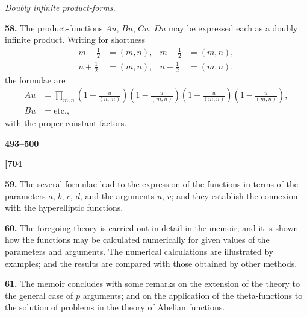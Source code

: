 \documentclass[11pt,a4paper]{book}
\begin{document}
\vspace{1em}

\begin{center}
\textit{Doubly infinite product-forms.}
\end{center}

\vspace{0.5em}

\noindent\textbf{58.}\quad
The product-functions $Au$, $Bu$, $Cu$, $Du$ may be expressed each as a doubly infinite product. Writing for shortness
\begin{align*}
m + \tfrac{1}{2} &= (m, n), & m - \tfrac{1}{2} &= (m, n), \\
n + \tfrac{1}{2} &= (m, n), & n - \tfrac{1}{2} &= (m, n),
\end{align*}
the formulae are
\begin{align*}
Au &= \prod_{m,n} \left(1 - \frac{u}{(m,n)}\right)\left(1 - \frac{u}{(m,n)}\right)\left(1 - \frac{u}{(m,n)}\right)\left(1 - \frac{u}{(m,n)}\right), \\
Bu &= \text{etc.},
\end{align*}
with the proper constant factors.

\vspace{1em}

\begin{center}
\textbf{493--500}
\end{center}

\vspace{0.5em}

\noindent\textbf{[704}

\vspace{0.5em}

\noindent\textbf{59.}\quad
The several formulae lead to the expression of the functions in terms of the parameters $a$, $b$, $c$, $d$, and the arguments $u$, $v$; and they establish the connexion with the hyperelliptic functions.

\noindent\textbf{60.}\quad
The foregoing theory is carried out in detail in the memoir; and it is shown how the functions may be calculated numerically for given values of the parameters and arguments. The numerical calculations are illustrated by examples; and the results are compared with those obtained by other methods.

\noindent\textbf{61.}\quad
The memoir concludes with some remarks on the extension of the theory to the general case of $p$ arguments; and on the application of the theta-functions to the solution of problems in the theory of Abelian functions.
\end{document}

